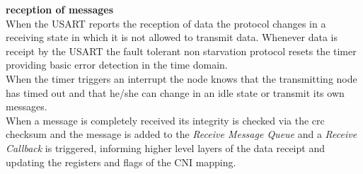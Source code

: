 \textbf{reception of messages}\\
When the USART reports the reception of data the protocol changes in a receiving state in which it is not allowed to transmit data.
Whenever data is receipt by the USART the fault tolerant non starvation protocol resets the timer providing basic error detection in the time domain.\\

When the timer triggers an interrupt the node knows that the transmitting node has timed out and that he/she can change in an idle state or transmit its own messages.\\

When a message is completely received its integrity is checked via the crc checksum and the message is added to the \textit{Receive Message Queue} and a \textit{Receive Callback} is triggered, informing higher level layers of the data receipt and updating the registers and flags of the CNI mapping.


% 
% 
% 

 